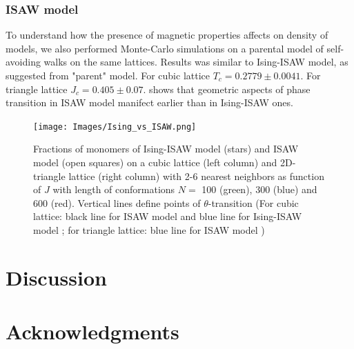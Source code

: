 \documentclass[a4paper]{jpconf}
\begin{document}
\subsubsection{ISAW model}

To understand how the presence of magnetic properties affects on density of models, we also performed Monte-Carlo simulations on a parental model of self-avoiding walks on the same lattices. Results was similar to Ising-ISAW model, as suggested from "parent" model. For cubic lattice $T_{c} = 0.2779\pm 0.0041 $\cite{Tesi1996}. For triangle lattice $J_{c} = 0.405 \pm 0.07 $\cite{Privman1986}.  shows that geometric aspects of phase transition in ISAW model manifect earlier than in Ising-ISAW ones.  

\begin{figure}
    \centering
    \texttt{[image: Images/Ising\_vs\_ISAW.png]}
    \caption{Fractions of monomers of Ising-ISAW model (stars) and ISAW model (open squares) on a cubic lattice (left column) and 2D-triangle lattice (right column) with 2-6 nearest neighbors as function of $J$ with length of conformations $N = $ 100 (green), 300 (blue) and 600 (red). Vertical lines define points of $\theta$-transition (For cubic lattice: black line for ISAW model \cite{Tesi1996} and blue line for Ising-ISAW model \cite{Foster2021}; for triangle lattice: blue line for ISAW model \cite{Privman1986})}
    \label{fig:Ising_vs_ISAW}
\end{figure}


\section{Discussion}

\section{Acknowledgments}

\newpage


\end{document}
